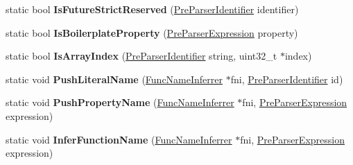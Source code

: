 \begin{DoxyCompactItemize}
\item 
\hypertarget{classv8_1_1internal_1_1_pre_parser_traits_af93c71e6f7b4b2afce824caff2bfef5c}{}static bool {\bfseries Is\+Future\+Strict\+Reserved} (\hyperlink{classv8_1_1internal_1_1_pre_parser_identifier}{Pre\+Parser\+Identifier} identifier)\label{classv8_1_1internal_1_1_pre_parser_traits_af93c71e6f7b4b2afce824caff2bfef5c}

\item 
\hypertarget{classv8_1_1internal_1_1_pre_parser_traits_a39c3c4c3993fcd26dc8c2809a9d5102a}{}static bool {\bfseries Is\+Boilerplate\+Property} (\hyperlink{classv8_1_1internal_1_1_pre_parser_expression}{Pre\+Parser\+Expression} property)\label{classv8_1_1internal_1_1_pre_parser_traits_a39c3c4c3993fcd26dc8c2809a9d5102a}

\item 
\hypertarget{classv8_1_1internal_1_1_pre_parser_traits_ac36e8eaa82df920e572fdc5f0f2b87e9}{}static bool {\bfseries Is\+Array\+Index} (\hyperlink{classv8_1_1internal_1_1_pre_parser_identifier}{Pre\+Parser\+Identifier} string, uint32\+\_\+t $\ast$index)\label{classv8_1_1internal_1_1_pre_parser_traits_ac36e8eaa82df920e572fdc5f0f2b87e9}

\item 
\hypertarget{classv8_1_1internal_1_1_pre_parser_traits_a1def14ba4bdc98f938bd33117767a262}{}static void {\bfseries Push\+Literal\+Name} (\hyperlink{classv8_1_1internal_1_1_func_name_inferrer}{Func\+Name\+Inferrer} $\ast$fni, \hyperlink{classv8_1_1internal_1_1_pre_parser_identifier}{Pre\+Parser\+Identifier} id)\label{classv8_1_1internal_1_1_pre_parser_traits_a1def14ba4bdc98f938bd33117767a262}

\item 
\hypertarget{classv8_1_1internal_1_1_pre_parser_traits_a9b17c0e9fc8b319e769666796aac2150}{}static void {\bfseries Push\+Property\+Name} (\hyperlink{classv8_1_1internal_1_1_func_name_inferrer}{Func\+Name\+Inferrer} $\ast$fni, \hyperlink{classv8_1_1internal_1_1_pre_parser_expression}{Pre\+Parser\+Expression} expression)\label{classv8_1_1internal_1_1_pre_parser_traits_a9b17c0e9fc8b319e769666796aac2150}

\item 
\hypertarget{classv8_1_1internal_1_1_pre_parser_traits_a39f0c9b323138750c812a6ffd9654015}{}static void {\bfseries Infer\+Function\+Name} (\hyperlink{classv8_1_1internal_1_1_func_name_inferrer}{Func\+Name\+Inferrer} $\ast$fni, \hyperlink{classv8_1_1internal_1_1_pre_parser_expression}{Pre\+Parser\+Expression} expression)\label{classv8_1_1internal_1_1_pre_parser_traits_a39f0c9b323138750c812a6ffd9654015}


\end{DoxyCompactItemize}
